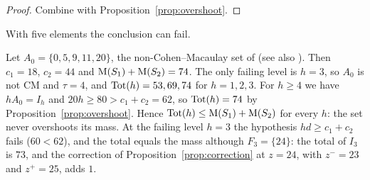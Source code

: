 \begin{proof}
Combine \cite[Theorem~A]{CompanionRegularity} with Proposition~\ref{prop:overshoot}.
\end{proof}

With five elements the conclusion can fail.

\begin{example}\label{ex:five-element}
Let $A_0=\{0,5,9,11,20\}$, the non-Cohen--Macaulay set of \cite[Example~4.3]{BermejoGimenez2006} (see also \cite[Example~2.13(2)]{GimenezGonzalezSanchez2023}). Then $c_1=18$, $c_2=44$ and $\operatorname{M}(S_1)+\operatorname{M}(S_2)=74$. The only failing level is $h=3$, so $A_0$ is not CM and $\tau=4$, and $\operatorname{Tot}(h)=53,69,74$ for $h=1,2,3$. For $h\ge4$ we have $hA_0=I_h$ and $20h\ge80>c_1+c_2=62$, so $\operatorname{Tot}(h)=74$ by Proposition~\ref{prop:overshoot}. Hence $\operatorname{Tot}(h)\le\operatorname{M}(S_1)+\operatorname{M}(S_2)$ for every $h$: the set never overshoots its mass. At the failing level $h=3$ the hypothesis $hd\ge c_1+c_2$ fails ($60<62$), and the total equals the mass although $F_3=\{24\}$: the total of $I_3$ is $73$, and the correction of Proposition~\ref{prop:correction} at $z=24$, with $z^-=23$ and $z^+=25$, adds $1$.
\end{example}
